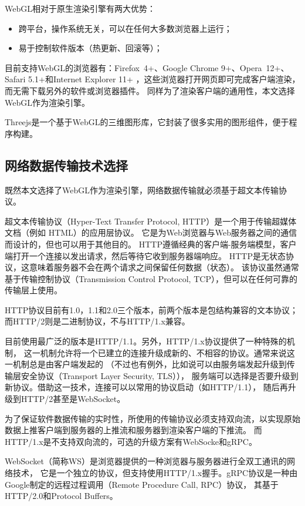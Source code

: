 WebGL相对于原生渲染引擎有两大优势：
\begin{itemize}
\item 跨平台，操作系统无关，可以在任何大多数浏览器上运行；
\item 易于控制软件版本（热更新、回滚等）；
\end{itemize} 

目前支持WebGL的浏览器有：Firefox 4+、Google Chrome 9+、Opera 12+、Safari 5.1+和Internet Explorer 11+
，这些浏览器打开网页即可完成客户端渲染，而无需下载另外的软件或浏览器插件。
同样为了渲染客户端的通用性，本文选择WebGL作为渲染引擎。

Threejs是一个基于WebGL的三维图形库\cite{threejs}，它封装了很多实用的图形组件，便于程序构建。


\subsection{网络数据传输技术选择}
\label{sec:net}

既然本文选择了WebGL作为渲染引擎，网络数据传输就必须基于超文本传输协议。

超文本传输协议\cite{rfc7230}（Hyper-Text Transfer Protocol, HTTP）是一个用于传输超媒体文档（例如 HTML）的应用层协议。
它是为Web浏览器与Web服务器之间的通信而设计的，但也可以用于其他目的。
HTTP遵循经典的客户端-服务端模型，客户端打开一个连接以发出请求，然后等待它收到服务器端响应。
HTTP是无状态协议，这意味着服务器不会在两个请求之间保留任何数据（状态）。
该协议虽然通常基于传输控制协议\cite{rfc793}（Transmission Control Protocol, TCP），但可以在任何可靠的传输层上使用。

HTTP协议目前有1.0，1.1和2.0三个版本，前两个版本是包结构兼容的文本协议；而HTTP/2则是二进制协议\cite{rfc7540}，不与HTTP/1.x兼容。

目前使用最广泛的版本是HTTP/1.1。另外，HTTP/1.x协议提供了一种特殊的机制，
这一机制允许将一个已建立的连接升级成新的、不相容的协议。通常来说这一机制总是由客户端发起的
（不过也有例外，比如说可以由服务端发起升级到传输层安全协议\cite{rfc8446}（Transport Layer Security, TLS）），
服务端可以选择是否要升级到新协议。借助这一技术，连接可以以常用的协议启动（如HTTP/1.1），
随后再升级到HTTP/2甚至是WebSocket\cite{rfc6455}。

为了保证软件数据传输的实时性，所使用的传输协议必须支持双向流，以实现原始数据上推客户端到服务器的上推流和服务器到渲染客户端的下推流。
而HTTP/1.x是不支持双向流的，可选的升级方案有WebSocke和gRPC。

WebSocket（简称WS）是浏览器提供的一种浏览器与服务器进行全双工通讯的网络技术，
它是一个独立的协议，但支持使用HTTP/1.x握手。gRPC协议\cite{grpc}是一种由Google制定的远程过程调用（Remote Procedure Call, RPC）协议，
其基于HTTP/2.0和Protocol Buffers\cite{protocol-buffers}。

